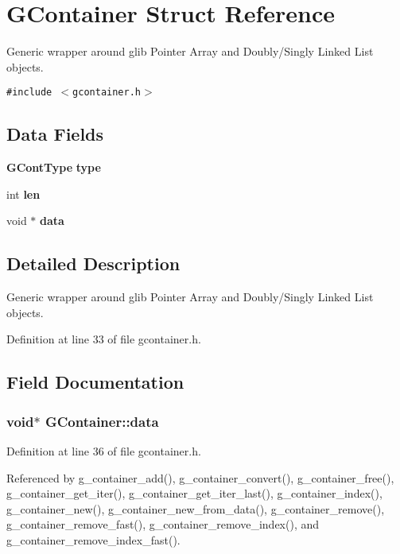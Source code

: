 \section{GContainer Struct Reference}
\label{structGContainer}
Generic wrapper around glib Pointer Array and Doubly/Singly Linked List objects.  


{\tt \#include $<$gcontainer.h$>$}

\subsection*{Data Fields}
\begin{CompactItemize}
\item 
{\bf GCont\-Type} {\bf type}
\item 
int {\bf len}
\item 
void $\ast$ {\bf data}
\end{CompactItemize}


\subsection{Detailed Description}
Generic wrapper around glib Pointer Array and Doubly/Singly Linked List objects. 



Definition at line 33 of file gcontainer.h.

\subsection{Field Documentation}
\subsubsection{\setlength{\rightskip}{0pt plus 5cm}void$\ast$ {\bf GContainer::data}}\label{structGContainer_o2}




Definition at line 36 of file gcontainer.h.

Referenced by g\_\-container\_\-add(), g\_\-container\_\-convert(), g\_\-container\_\-free(), g\_\-container\_\-get\_\-iter(), g\_\-container\_\-get\_\-iter\_\-last(), g\_\-container\_\-index(), g\_\-container\_\-new(), g\_\-container\_\-new\_\-from\_\-data(), g\_\-container\_\-remove(), g\_\-container\_\-remove\_\-fast(), g\_\-container\_\-remove\_\-index(), and g\_\-container\_\-remove\_\-index\_\-fast().
